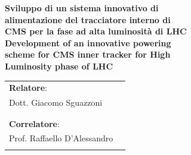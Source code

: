 \begin{titlepage}
\begin{center}
\begin{minipage}{\textwidth}
\begin{minipage}{0.4\textwidth}
\begin{flushright}
      \end{flushright}
    \end{minipage}
  \end{minipage}
  \vspace*{1.5cm}
  \vfill
  \begin{minipage}{0.8\textwidth}
  \begin{flushleft}
      {\large {\bf Sviluppo di un sistema innovativo di}} \\
      \vspace*{0.2cm}
      {\large {\bf alimentazione del tracciatore interno di}} \\
      \vspace*{0.2cm}
      {\large {\bf CMS per la fase ad alta luminosità di LHC}} \\
      \vspace*{0.2cm}
    \vspace*{1cm}
    {\large {\bf Development of an innovative powering }} \\
    \vspace*{0.2cm}
    {\large {\bf scheme for CMS inner tracker for High}} \\
    \vspace*{0.2cm}
    {\large {\bf Luminosity phase of LHC}}\\
   \vspace*{0.2cm}
    \vspace*{2cm}
    \begin{tabular}{l l}
      {\large \bf{Relatore}}: & {\large {\bf }}\\
      {\large Dott. Giacomo Sguazzoni} & {\large {\bf }}\\
      \\
      \\
      {\large \bf{Correlatore}}: & {\large{\bf }}\\
      {\large Prof. Raffaello D'Alessandro} & {\large {\bf }}\\
      \\

\end{tabular}
\end{flushleft}
\end{minipage}
\end{center}
\end{titlepage}
